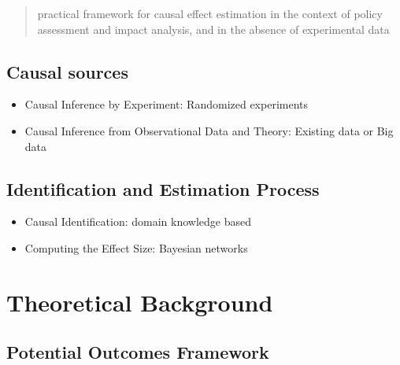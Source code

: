 \documentclass[]{book}
\providecommand{\tightlist}{%
  \setlength{\itemsep}{0pt}\setlength{\parskip}{0pt}}
\begin{document}
\begin{quote}
practical framework for causal effect estimation in the context of policy assessment and impact analysis, and in the absence of experimental data
\end{quote}

\hypertarget{causal-sources}{%
\subsection{Causal sources}\label{causal-sources}}

\begin{itemize}
\tightlist
\item
  Causal Inference by Experiment: Randomized experiments
\item
  Causal Inference from Observational Data and Theory: Existing data or Big data
\end{itemize}

\hypertarget{identification-and-estimation-process}{%
\subsection{Identification and Estimation Process}\label{identification-and-estimation-process}}

\begin{itemize}
\tightlist
\item
  Causal Identification: domain knowledge based
\item
  Computing the Effect Size: Bayesian networks
\end{itemize}

\hypertarget{theoretical-background}{%
\section{Theoretical Background}\label{theoretical-background}}

\hypertarget{potential-outcomes-framework}{%
\subsection{Potential Outcomes Framework}\label{potential-outcomes-framework}}
\end{document}
